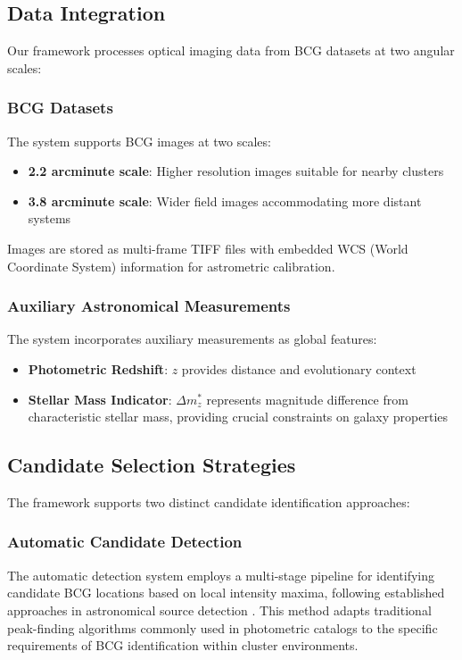 \documentclass[twocolumn,10pt]{aastex631}
\begin{document}
\subsection{Data Integration}

Our framework processes optical imaging data from BCG datasets at two angular scales:

\subsubsection{BCG Datasets}
The system supports BCG images at two scales:
\begin{itemize}
\item \textbf{2.2 arcminute scale}: Higher resolution images suitable for nearby clusters
\item \textbf{3.8 arcminute scale}: Wider field images accommodating more distant systems
\end{itemize}

Images are stored as multi-frame TIFF files with embedded WCS (World Coordinate System) information for astrometric calibration.

\subsubsection{Auxiliary Astronomical Measurements}
The system incorporates auxiliary measurements as global features:
\begin{itemize}
\item \textbf{Photometric Redshift}: $z$ provides distance and evolutionary context
\item \textbf{Stellar Mass Indicator}: $\Delta m^*_z$ represents magnitude difference from characteristic stellar mass, providing crucial constraints on galaxy properties
\end{itemize}

\subsection{Candidate Selection Strategies}

The framework supports two distinct candidate identification approaches:

\subsubsection{Automatic Candidate Detection}

The automatic detection system employs a multi-stage pipeline for identifying candidate BCG locations based on local intensity maxima, following established approaches in astronomical source detection \citep{Bertin1996}. This method adapts traditional peak-finding algorithms commonly used in photometric catalogs to the specific requirements of BCG identification within cluster environments.
\end{document}
